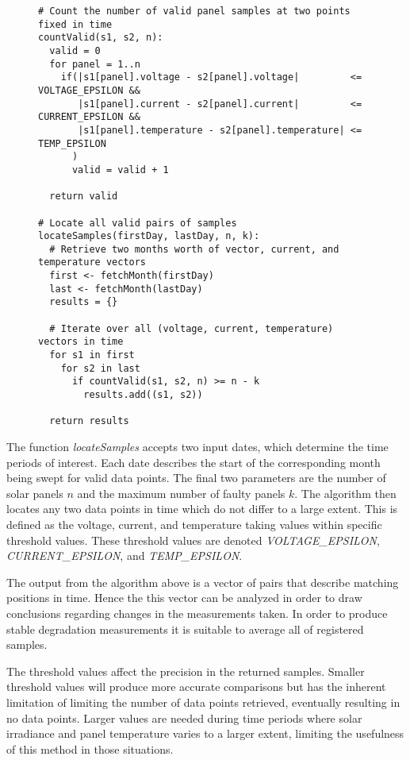 \begin{figure}[H]
\begin{verbatim}
# Count the number of valid panel samples at two points fixed in time
countValid(s1, s2, n):
  valid = 0
  for panel = 1..n
    if(|s1[panel].voltage - s2[panel].voltage|         <= VOLTAGE_EPSILON &&
       |s1[panel].current - s2[panel].current|         <= CURRENT_EPSILON &&
       |s1[panel].temperature - s2[panel].temperature| <= TEMP_EPSILON
      )
      valid = valid + 1

  return valid

# Locate all valid pairs of samples
locateSamples(firstDay, lastDay, n, k):
  # Retrieve two months worth of vector, current, and temperature vectors
  first <- fetchMonth(firstDay)
  last <- fetchMonth(lastDay)
  results = {}

  # Iterate over all (voltage, current, temperature) vectors in time
  for s1 in first
    for s2 in last
      if countValid(s1, s2, n) >= n - k
        results.add((s1, s2))

  return results
\end{verbatim}
\end{figure}

The function \emph{locateSamples} accepts two input dates, which determine the time periods of interest.
Each date describes the start of the corresponding month being swept for valid data points.
The final two parameters are the number of solar panels $n$ and the maximum number of faulty panels $k$.
The algorithm then locates any two data points in time which do not differ to a large extent.
This is defined as the voltage, current, and temperature taking values within specific threshold values.
These threshold values are denoted \emph{VOLTAGE\_EPSILON}, \emph{CURRENT\_EPSILON}, and \emph{TEMP\_EPSILON}.

The output from the algorithm above is a vector of pairs that describe matching positions in time.
Hence the this vector can be analyzed in order to draw conclusions regarding changes in the measurements taken.
In order to produce stable degradation measurements it is suitable to average all of registered samples.

The threshold values affect the precision in the returned samples.
Smaller threshold values will produce more accurate comparisons but has the inherent limitation of limiting the number of data points retrieved, eventually resulting in no data points.
Larger values are needed during time periods where solar irradiance and panel temperature varies to a larger extent, limiting the usefulness of this method in those situations.

